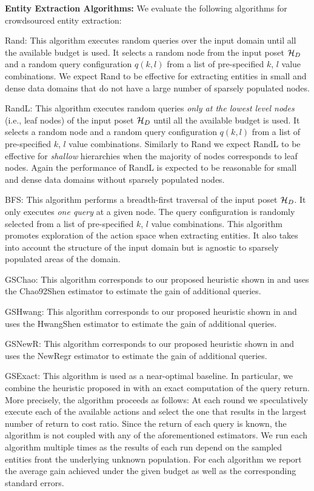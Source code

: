 \vspace{5pt}\noindent\textbf{Entity Extraction Algorithms:} We evaluate the following algorithms for crowdsourced entity extraction:
\squishlist
\item Rand: This algorithm executes random queries over the input domain until all the available budget is used. It selects a random node from the input poset $\mathcal{H}_D$ and a random query configuration $q(k,l)$ from a list of pre-specified $k$, $l$ value combinations. We expect Rand to be effective for extracting entities in small and dense data domains that do not have a large number of sparsely populated nodes. 
\item RandL: This algorithm executes random queries {\em only at the lowest level nodes} (i.e., leaf nodes) of the input poset $\mathcal{H}_D$ until all the available budget is used. It selects a random node and a random query configuration $q(k,l)$ from a list of pre-specified $k$, $l$ value combinations. Similarly to Rand we expect RandL to be effective for {\em shallow} hierarchies when the majority of nodes corresponds to leaf nodes. Again the performance of RandL is expected to be reasonable for small and dense data domains without sparsely populated nodes. 
\item BFS: This algorithm performs a breadth-first traversal of the input poset $\mathcal{H}_D$. It only executes {\em one query} at a given node. The query configuration is randomly selected from a list of pre-specified $k$, $l$ value combinations. This algorithm promotes exploration of the action space when extracting entities. It also takes into account the structure of the input domain but is agnostic to sparsely populated areas of the domain.
\item GSChao: This algorithm corresponds to our proposed heuristic shown in  and uses the Chao92Shen estimator to estimate the gain of additional queries.
\item GSHwang: This algorithm corresponds to our proposed heuristic shown in  and uses the HwangShen estimator to estimate the gain of additional queries.
\item GSNewR: This algorithm corresponds to our proposed heuristic shown in  and uses the NewRegr estimator to estimate the gain of additional queries.
\item GSExact: This algorithm is used as a near-optimal baseline. In particular, we combine the heuristic proposed in  with an exact computation of the query return. More precisely, the algorithm proceeds as follows: At each round we speculatively execute each of the available actions and select the one that results in the largest  number of return to cost ratio. Since the return of each query is known, the algorithm is not coupled with any of the aforementioned estimators.
\squishend
We run each algorithm multiple times as the results of each run depend on the sampled entities front the underlying unknown population. For each algorithm we report the average gain achieved under the given budget as well as the corresponding standard errors.

